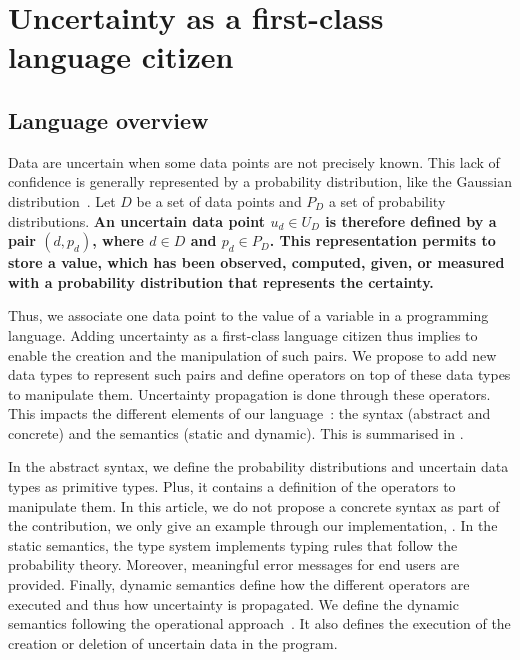 \section{Uncertainty as a first-class language citizen}
\label{sec:aintea:duc}

\subsection{Language overview}
Data are uncertain when some data points are not precisely known. 
This lack of confidence is generally represented by a probability distribution, like the Gaussian distribution~\cite{metrology2008evaluation}.
Let $D$ be a set of data points and $P_D$ a set of probability distributions.
\textbf{An uncertain data point $u_d \in U_D$ is therefore defined by a pair $(d, p_d)$, where $d \in D$ and $p_d \in P_D$.
This representation permits to store a value, which has been observed, computed, given, or measured with a probability distribution that represents the certainty.}

Thus, we associate one data point to the value of a variable in a programming language.
Adding uncertainty as a first-class language citizen thus implies to enable the creation and the manipulation of such  pairs.
We propose to add new data types to represent such pairs and define operators on top of these data types to  manipulate them.
Uncertainty propagation is done through these operators.
This impacts the different elements of our language~\cite{DBLP:journals/computer/HarelR04, DBLP:phd/hal/Degueule16}: the syntax (abstract and concrete) and the semantics (static and dynamic).
This is summarised in .

In the abstract syntax, we define the probability distributions and uncertain data types as primitive types.
Plus, it contains a definition of the operators to manipulate them.
In this article, we do not propose a concrete syntax as part of the contribution, we only give an example through our implementation, \langName{}.
In the static semantics, the type system implements typing rules that follow the probability theory.
Moreover, meaningful error messages for end users are provided.
Finally, dynamic semantics define how the different operators are executed and thus how uncertainty is propagated.
We define the dynamic semantics following the operational approach~\cite{DBLP:conf/ershov/Mosses01}.
It also defines the execution of the creation or deletion of uncertain data in the program.

